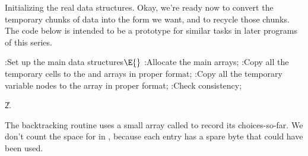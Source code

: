 Initializing the real data structures.
Okay, we're ready now to convert the temporary chunks of data into the
form we want, and to recycle those chunks. The code below is intended to be
a prototype for similar tasks in later programs of this series.

\Y\B\4:Set up the main data structures\X${}\E{}$\6
:Allocate the main arrays\X;\6
:Copy all the temporary cells to the  and  arrays
in proper format\X;\6
:Copy all the temporary variable nodes to the  array in proper
format\X;\6
:Check consistency\X;\par
\U2.\fi

The backtracking routine uses a small array called  to record
its choices-so-far. We don't count the space for  in , because
each  entry has a spare byte that could have been used.

